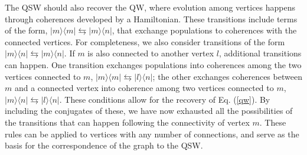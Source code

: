 \documentclass[11pt,oneside,final]{huthesis}%
\begin{document}
The QSW should also recover the QW, where evolution among vertices
happens through coherences developed by a Hamiltonian. These
transitions include terms of the form, $\vert m \rangle \langle m
\vert \leftrightarrows \vert m\rangle \langle n \vert$, that
exchange populations to coherences with the connected vertices. For
completeness, we also consider transitions of the form $\vert m
\rangle \langle n \vert \leftrightarrows \vert m\rangle \langle n
\vert$. If $m$ is also connected to another vertex $l$, additional
transitions can happen. One transition exchanges populations into
coherences among the two vertices connected to $m$, $\vert m \rangle
\langle m \vert \leftrightarrows \vert l\rangle \langle n \vert$; the
other exchanges coherences between $m$ and a connected vertex into
coherence among two vertices connected to $m$, $\vert m \rangle
\langle n \vert \leftrightarrows \vert l\rangle \langle n
\vert$. These conditions allow for the recovery of Eq. (\ref{qw}).  By including
the conjugates of these, we have now exhausted all the possibilities
of the transitions that can happen following the connectivity of
vertex $m$. These rules can be applied to vertices with any number of
connections, and serve as the basis for the correspondence of the
graph to the QSW.
\end{document}
